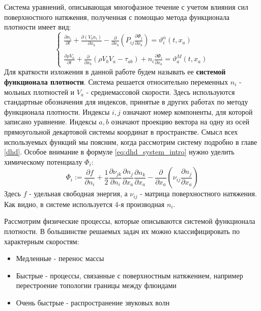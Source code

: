 \documentclass[a4paper,12pt]{article}
\begin{document}
\par
Система уравнений, описывающая многофазное течение с учетом влияния сил поверхностного натяжения, полученная с помощью метода функционала плотности имеет вид:
\begin{equation} \label{eq:dhd_system_intro}
\begin{cases}
\frac{\partial n_{i}}{\partial t}+\frac{\partial\left(V_{b}n_{i}\right)}{\partial x_{b}}-\frac{\partial}{\partial x_{b}}\left(P_{i j}\frac{\partial\Phi_{j}}{\partial x_{b}}\right)=\vartheta_{i}^{n}(t,x_{a}) 
\\ \\
\frac {\partial\rho V_{a}} {\partial t} + \frac {\partial} {\partial x_{b}} \left( \rho V_{b}V_{a} - \tau_{ab} \right) + n_i \frac{\partial \Phi_i}{\partial x_a}=\vartheta_{a}^{M}(t,x_{a})
\end{cases}
\end{equation}
Для краткости изложения в данной работе будем называть ее \textbf{системой функционала плотности}. Система решается относительно переменных $n_i$ - мольных плотностей и $V_a$ - среднемассовой скорости. Здесь используются стандартные обозначения для индексов, принятые в других работах по методу функционала плотности. Индексы $i, j$ означают номер компоненты, для которой записано уравнение. Индексы $a, b$ означают проекцию вектора на одну из осей прямоугольной декартовой системы координат в пространстве. Смысл всех используемых функций мы поясним, когда рассмотрим систему подробно в главе \ref{dhd}.
Особое внимание в формуле \eqref{eq:dhd_system_intro} нужно уделить химическому потенциалу $\Phi_i$:
\begin{equation} \label{eq:chemical_potential_intro}
\Phi_i := \frac{\partial f}{\partial n_{i}}+\frac{1}{2}\frac{\partial\nu_{jk}}{\partial n_{i}}\frac{\partial n_{j}}{\partial x_{a}}\frac{\partial n_{k}}{\partial x_{a}}-\frac{\partial}{\partial x_{a}}\left(\nu_{ij}\frac{\partial n_{j}}{\partial x_{a}}\right)
\end{equation}
Здесь $f$ - удельная свободная энергия, а $\nu_{ij}$ - матрица поверхностного натяжения. Как видно, в системе используется 4-я производная $n_i$.
\par
Рассмотрим физические процессы, которые описываются системой функционала плотности. В большинстве решаемых задач их можно классифицировать по характерным скоростям:
\begin{itemize}
\item Медленные - перенос массы
\item Быстрые - процессы, связанные с поверхностным натяжением, например перестроение топологии границы между флюидами
\item Очень быстрые - распространение звуковых волн
\end{itemize}
\end{document}

